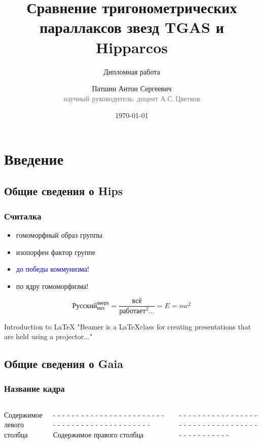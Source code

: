 \documentclass[14pt,aspectratio=43]{beamer}
\begin{document}
\title{Сравнение тригонометрических параллаксов звезд TGAS и Hipparcos}
\subtitle[Диплом]{Дипломная работа}
\author[А.С.\,Патшин]{Патшин Антон Сергеевич\\{\footnotesize\textcolor{gray}{научный руководитель: доцент А.С.\,Цветков}}}
\date{\today} 





\maketitle

\section{Введение}
\subsection{Общие сведения о Hips}
\label{sub:smthhip}
\begin{frame}\frametitle{Считалка} 

  \begin{itemize}
  \item гомоморфный образ группы
  \item изопорфен фактор группе
  \item {\Large \textcolor{blue}{до победы коммунизма!}}
  \item по ядру гомоморфизма!
  \end{itemize}
\begin{equation}
    Русский_{низ}^{вверх} = \frac{всё}{работает^2\dots} = E = m c^2
\end{equation}

\begin{block}{Introduction to {\LaTeX}}
"Beamer is a {\LaTeX}class for creating presentations that
are held using a projector..."
\end{block}
\end{frame}


\subsection{Общие сведения о Gaia}
\label{sub:smthgaia}
\begin{frame}\frametitle{Название кадра}

 	\begin{columns}
 			Содержимое левого столбца
 			
 			- - - - - - - - - - - - - - - - - - - - - - - - - - - - - - - - - - - - - - - - - - - - - 
 			Содержимое правого столбца
 			
 			- - - - - - - - - - - - - - - - - - - - - - - - - - - - - - - - - - - - - - - - - - - - - 
 	\end{columns}
\end{frame}
\end{document}
